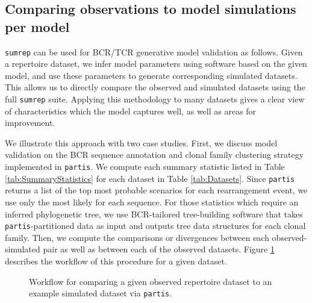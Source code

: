 \documentclass{article}
\begin{document}
\subsection*{Comparing observations to model simulations per model}
\texttt{sumrep} can be used for BCR/TCR generative model validation as follows.
Given a repertoire dataset, we infer model parameters using software based on the given model, and use these parameters to generate corresponding simulated datasets.
This allows us to directly compare the observed and simulated datasets using the full \texttt{sumrep} suite.
Applying this methodology to many datasets gives a clear view of characteristics which the model captures well, as well as areas for improvement.

We illustrate this approach with two case studies.
First, we discuss model validation on the BCR sequence annotation and clonal family clustering strategy implemented in \texttt{partis}\cite{Ralph2016-nw, Ralph2016-iz}.
We compute each summary statistic listed in Table \ref{tab:SummaryStatistics} for each dataset in Table \ref{tab:Datasets}.
Since \texttt{partis} returns a list of the top most probable scenarios for each rearrangement event, we use only the most likely for each sequence.
For those statistics which require an inferred phylogenetic tree, we use BCR-tailored tree-building software that takes \texttt{partis}-partitioned data as input and outputs tree data structures for each clonal family.
Then, we compute the comparisons or divergences between each observed-simulated pair as well as between each of the observed datasets.
Figure \ref{PartisWorkflow} describes the workflow of this procedure for a given dataset.
\begin{figure}
\begin{adjustbox}{max totalsize={\textwidth}{.5\textheight},center}
\end{adjustbox}
\caption{Workflow for comparing a given observed repertoire dataset to an example simulated dataset via \texttt{partis}.}
\label{PartisWorkflow}
\end{figure}
\end{document}
